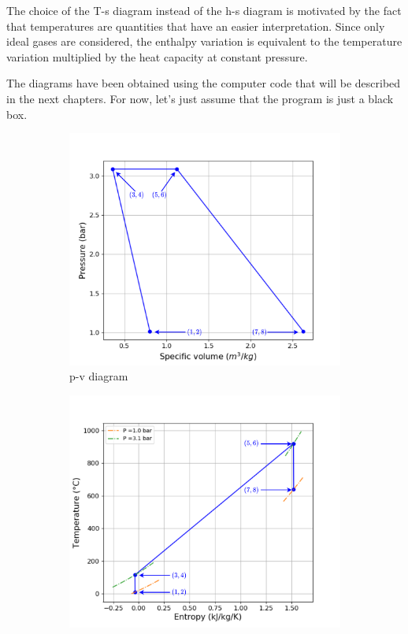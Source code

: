The choice of the T-s diagram instead of the h-s diagram is motivated by the fact that temperatures are quantities that have an easier interpretation. Since only ideal gases are considered, the enthalpy variation is equivalent to the temperature variation multiplied by the heat capacity at constant pressure.

The diagrams have been obtained using the computer code that will be described in the next chapters. For now, let's just assume that the program is just a black box.

\begin{figure}[H]
     \centering
     \begin{subfigure}[b]{0.4\textwidth}
         \centering
         \includegraphics[width=\textwidth]{pv_GT}
         \caption{p-v diagram}
         \label{fig:C5_pv_GT}
     \end{subfigure}
     \begin{subfigure}[b]{0.4\textwidth}
         \centering
         \includegraphics[width=\textwidth]{Ts_GT}

\end{subfigure}
\end{figure}
